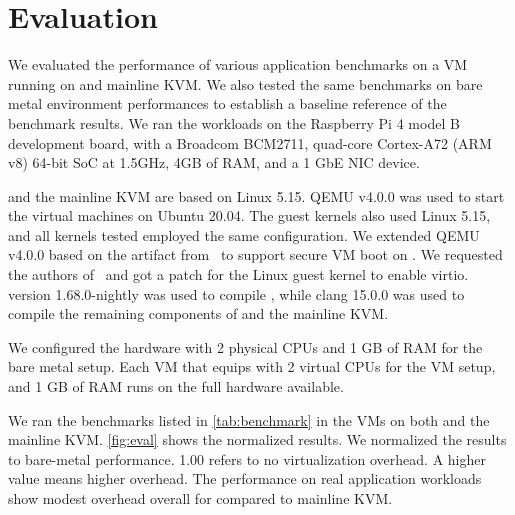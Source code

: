 \chapter{Evaluation}
\label{sec:eval}

We evaluated the performance of various application benchmarks
on a VM running on \rustsec{} and mainline KVM. We also tested the same
benchmarks on bare metal environment performances to establish a baseline
reference of the benchmark results. We ran the workloads on the Raspberry
Pi 4 model B development board, with a Broadcom BCM2711, quad-core
Cortex-A72 (ARM v8) 64-bit SoC at 1.5GHz, 4GB of RAM, and a 1 GbE NIC device.

\rustsec{} and the mainline KVM are based on Linux 5.15.
QEMU v4.0.0 was used to start the virtual machines on Ubuntu 20.04. The guest
kernels also used Linux 5.15, and all kernels tested employed the same 
configuration.
We extended QEMU v4.0.0 based on the artifact
from~\cite{sekvm-artifact} to support secure VM boot on \rustsec{}. We requested the
authors of~\cite{hypsec} and got a patch for the Linux guest kernel to
enable virtio.
 version 1.68.0-nightly was used to compile \rustcore{},
while clang 15.0.0 was used to compile the remaining components of
\rustsec{} and the mainline KVM.

We configured the hardware with 2 physical CPUs and 1 GB of RAM for the bare
metal setup. Each VM that equips with 2 virtual CPUs for the VM setup, and 1
GB of RAM runs on the full hardware available.

We ran the benchmarks listed in \autoref{tab:benchmark} in the VMs on both
\rustsec{} and the mainline KVM. \autoref{fig:eval} shows the normalized
results. We normalized the results to bare-metal performance. 1.00 refers
to no virtualization overhead.
A higher value means higher overhead. The performance on real application
workloads show modest overhead overall for \rustsec{} compared to mainline KVM.

